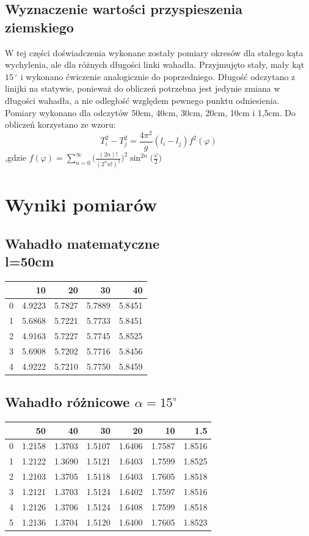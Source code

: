 \documentclass[a4paper,10pt]{article}
\begin{document}
\subsection{Wyznaczenie wartości przyspieszenia ziemskiego}
W tej części doświadczenia wykonane zostały pomiary okresów dla stałego kąta wychylenia, ale dla różnych długości linki wahadła. Przyjmujęto stały, mały kąt $15\,^{\circ}$ i wykonano ćwiczenie analogicznie do poprzedniego. Długość odczytano z linijki na statywie, ponieważ do obliczeń potrzebna jest jedynie zmiana w długości wahadła, a nie odległość względem pewnego punktu odniesienia. Pomiary wykonano dla odczytów 50cm, 40cm, 30cm, 20cm, 10cm i 1,5cm. Do obliczeń korzystano ze wzoru:
\begin{equation}
T_i^2-T_j^2 = \frac{4\pi^2}{g}(l_i-l_j)f^2(\varphi)
\end{equation}
,gdzie $f(\varphi)=\sum_{n=0}^{\infty}\bigg(\frac{(2n)!}{(2^nn!)^2}\bigg)^2\sin^{2n}\bigg(\frac{\varphi}{2}\bigg)$

\section{Wyniki pomiarów}
\subsection{Wahadło matematyczne\\l=50cm}
\begin{tabular}{lrrrr}
\toprule
{} &      10 &      20 &      30 &      40 \\
\midrule
0 &  4.9223 &  5.7827 &  5.7889 &  5.8451 \\
1 &  5.6868 &  5.7221 &  5.7733 &  5.8451 \\
2 &  4.9163 &  5.7227 &  5.7745 &  5.8525 \\
3 &  5.6908 &  5.7202 &  5.7716 &  5.8456 \\
4 &  4.9222 &  5.7210 &  5.7750 &  5.8459 \\
\bottomrule
\end{tabular}
\subsection{Wahadło różnicowe $\alpha = 15^\circ$}
\begin{tabular}{lrrrrrr}
\toprule
{} &      50 &      40 &      30 &      20 &      10 &     1.5 \\
\midrule
0 &  1.2158 &  1.3703 &  1.5107 &  1.6406 &  1.7587 &  1.8516 \\
1 &  1.2122 &  1.3690 &  1.5121 &  1.6403 &  1.7599 &  1.8525 \\
2 &  1.2103 &  1.3705 &  1.5118 &  1.6403 &  1.7605 &  1.8518 \\
3 &  1.2121 &  1.3703 &  1.5124 &  1.6402 &  1.7597 &  1.8516 \\
4 &  1.2126 &  1.3706 &  1.5124 &  1.6408 &  1.7599 &  1.8518 \\
5 &  1.2136 &  1.3704 &  1.5120 &  1.6400 &  1.7605 &  1.8523 \\
\bottomrule
\end{tabular}
\end{document}
